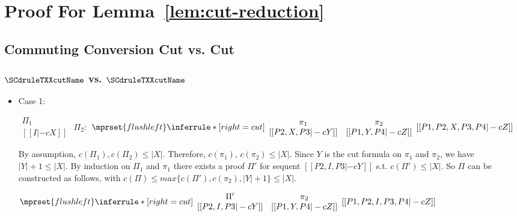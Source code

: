 \section{Proof For Lemma~\ref{lem:cut-reduction}}


\subsection{Commuting Conversion Cut vs. Cut}

\subsubsection{$\SCdruleTXXcutName$ vs. $\SCdruleTXXcutName$}
\begin{itemize}
\item Case 1:
      \begin{center}
        \scriptsize
        \begin{math}
          \begin{array}{c}
            \Pi_1 \\
            {[[I |-c X]]}
          \end{array}
        \end{math}
        \qquad\qquad
        $\Pi_2:$
        \begin{math}
          $$\mprset{flushleft}
          \inferrule* [right={\tiny cut}] {
            {
              \begin{array}{cc}
                \pi_1 & \pi_2 \\
                {[[P2, X, P3 |-c Y]]} & {[[P1, Y, P4 |-c Z]]}
              \end{array}
            }
          }{[[P1, P2, X, P3, P4 |-c Z]]}
        \end{math}
      \end{center}
      By assumption, $c(\Pi_1),c(\Pi_2)\leq |X|$. Therefore, $c(\pi_1)$,
      $c(\pi_2)\leq |X|$. Since $Y$ is the cut formula on $\pi_1$ and
      $\pi_2$, we have $|Y|+1\leq|X|$. By induction on $\Pi_1$ and $\pi_1$
      there exists a proof $\Pi'$ for sequent $[[P2, I, P3 |-c Y]]$ s.t.
      $c(\Pi')\leq|X|$. So $\Pi$ can be constructed as follows, with
      $c(\Pi)\leq max\{c(\Pi'),c(\pi_2),|Y|+1\}\leq |X|$.
      \begin{center}
        \scriptsize
        \begin{math}
          $$\mprset{flushleft}
          \inferrule* [right={\tiny cut}] {
            {
              \begin{array}{cc}
                \Pi' & \pi_2 \\
                {[[P2, I, P3 |-c Y]]} & {[[P1, Y, P4 |-c Z]]}
              \end{array}
            }
          }{[[P1, P2, I, P3, P4 |-c Z]]}
        \end{math}
      \end{center}


\end{itemize}

